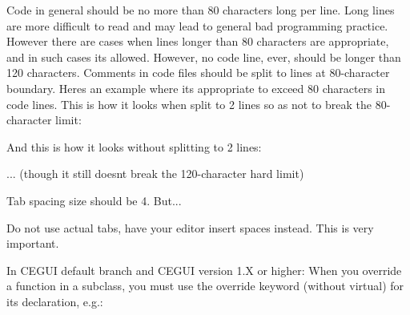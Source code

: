\begin{DoxyItemize}
\item Code in general should be no more than 80 characters long per line. Long lines are more difficult to read and may lead to general bad programming practice. However there are cases when lines longer than 80 characters are appropriate, and in such cases it\textquotesingle{}s allowed. However, no code line, ever, should be longer than 120 characters. Comments in code files should be split to lines at 80-\/character boundary. Here\textquotesingle{}s an example where it\textquotesingle{}s appropriate to exceed 80 characters in code lines. This is how it looks when split to 2 lines so as not to break the 80-\/character limit\+: 
\begin{DoxyCode}{0}
\end{DoxyCode}
 And this is how it looks without splitting to 2 lines\+: 
\begin{DoxyCode}{0}
\end{DoxyCode}
 ... (though it still doesn\textquotesingle{}t break the 120-\/character hard limit)
\item Tab spacing size should be 4. But...
\item Do not use actual tabs, have your editor insert spaces instead. This is very important.
\item In C\+E\+G\+UI default branch and C\+E\+G\+UI version 1.\+X or higher\+: When you override a function in a subclass, you must use the override keyword (without virtual) for its declaration, e.\+g.\+: 
\begin{DoxyCode}{0}
\DoxyCodeLine{\{}
\DoxyCodeLine{\}}
\DoxyCodeLine{}
\DoxyCodeLine{\{}
\DoxyCodeLine{\}}
\end{DoxyCode}


\end{DoxyItemize}
